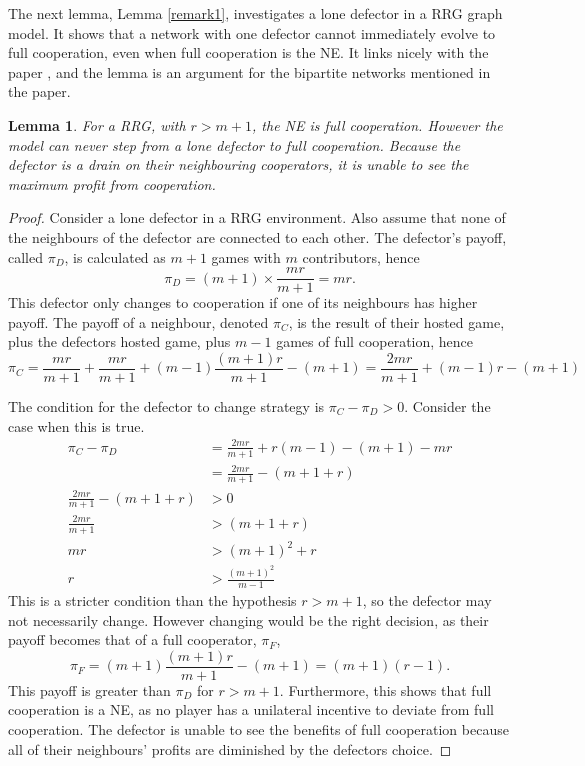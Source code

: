 The next lemma, Lemma \ref{remark1}, investigates a lone defector in a RRG graph model. It shows that a network with one defector cannot immediately evolve to full cooperation, even when full cooperation is the NE. It links nicely with the paper \cite{RN48}, and the lemma is an argument for the bipartite networks mentioned in the paper. 
 \newtheorem{remark1}[theorem]{Lemma} \label{remark1}
\begin{remark1}
For a RRG, with $r>m+1$, the NE is full cooperation. However the model can never step from a lone defector to full cooperation. Because the defector is a drain on their neighbouring cooperators, it is unable to see the maximum profit from cooperation. 
\end{remark1}
\begin{proof}
Consider a lone defector in a RRG environment. Also assume that none of the neighbours of the defector are connected to each other. The defector's payoff, called $\pi_D$, is calculated as $m+1$ games with $m$ contributors, hence $$\pi_D = (m+1) \times \frac{mr}{m+1} = mr. $$ This defector only changes to cooperation if one of its neighbours has higher payoff. The payoff of a neighbour, denoted $\pi_C$, is the result of their hosted game, plus the defectors hosted game, plus $m-1$ games of full cooperation, hence $$\pi_C = \frac{mr}{m+1}+\frac{mr}{m+1} + (m-1) \frac{(m+1 )r}{m+1} - (m+1) = \frac{2mr}{m+1} +(m-1)r - (m+1) $$ 


The condition for the defector to change strategy is $\pi_C  - \pi_D>0$. Consider the case when this is true. \\
\begin{align*}
    \pi_C - \pi_D &= \frac{2mr}{m+1} +r(m-1) -(m+1)-mr\\
    &= \frac{2mr}{m+1} -(m+1+r)\\
    \frac{2mr}{m+1} -(m+1+r) &> 0\\
    \frac{2mr}{m+1} &>(m+1+r)\\
    mr &>(m+1)^2+r\\
    r&>\frac{(m+1)^2}{m-1}
\end{align*}
This is a stricter condition than the hypothesis $r>m+1$, so the defector may not necessarily change. However changing would be the right decision, as their payoff becomes that of a full cooperator, $\pi_{F}$, $$ \pi_F = (m+1)\frac{(m+1)r}{m+1} - (m+1) = (m+1)(r-1). $$ This payoff is greater than $\pi_D$ for $r>m+1$. Furthermore, this shows that full cooperation is a NE, as no player has a unilateral incentive to deviate from full cooperation. The defector is unable to see the benefits of full cooperation because all of their neighbours' profits are diminished by the defectors choice. \end{proof}



